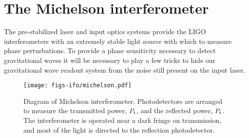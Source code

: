 \section{The Michelson interferometer}
\label{sec:michelson}
The pre-stabilized laser and input optics systems provide the LIGO interferometers with an extremely stable light source with which to measure phase perturbations. %
To provide a phase sensitivity necessary to detect gravitational waves it will be necessary to play a few tricks to hide our gravitational wave readout system from the noise still present on the input laser.

\begin{figure}
  \begin{center}
  \leavevmode
  \texttt{[image: figs-ifo/michelson.pdf]}
  \end{center}
  \caption[Diagram of a Michelson interferometer.]{Diagram of Michelson interferometer. Photodetectors are arranged to measure the transmitted power, $P_{\rm t}$, and the reflected power, $P_{\rm t}$. The interferometer is operated near a dark fringe on transmission, and most of the light is directed to the reflection photodetector.}
  \label{fig:michelson}
\end{figure}

